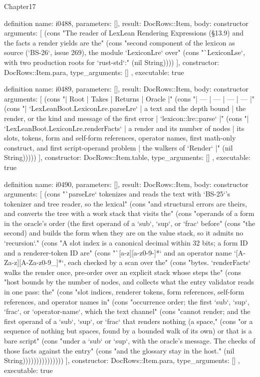 \begin{lexlean}{Chapter17}
\begin{semanticmodule}
definition{
  name: i0488,
  parameters: [],
  result: DocRows::Item,
  body: constructor{
    arguments: [
      (cons "The reader of LexLean Rendering Expressions (§13.9) and the facts a render yields are the" (cons "second component of the lexicon as source (`BS-26`, issue 269), the module `LexiconLre` over" (cons "`LexiconLse`, with two production roots for `rust-std`:" (nil String))))
    ],
    constructor: DocRows::Item.para,
    type_arguments: []
  },
  executable: true
}

definition{
  name: i0489,
  parameters: [],
  result: DocRows::Item,
  body: constructor{
    arguments: [
      (cons "| Root | Takes | Returns | Oracle |" (cons "| --- | --- | --- | --- |" (cons "| `LexLeanBoot.LexiconLre.parseLre` | a text and the depth bound | the render, or the kind and message of the first error | `lexicon::lre::parse` |" (cons "| `LexLeanBoot.LexiconLre.renderFacts` | a render and its number of nodes | its slots, tokens, form and self-form references, operator names, first math-only construct, and first script-operand problem | the walkers of `Render` |" (nil String)))))
    ],
    constructor: DocRows::Item.table,
    type_arguments: []
  },
  executable: true
}

definition{
  name: i0490,
  parameters: [],
  result: DocRows::Item,
  body: constructor{
    arguments: [
      (cons "`parseLre` tokenizes and reads the text with `BS-25`'s tokenizer and tree reader, so the lexical" (cons "and structural errors are theirs, and converts the tree with a work stack that visits the" (cons "operands of a form in the oracle's order (the first operand of a `sub`, `sup`, or `frac` before" (cons "the second) and builds the form when they are on the value stack, so it admits no `recursion`." (cons "A slot index is a canonical decimal within 32 bits; a form ID and a renderer-token ID are" (cons "`[a-z][a-z0-9-]*` and an operator name `[A-Za-z][A-Za-z0-9_]*`, each checked by a scan over the" (cons "bytes. `renderFacts` walks the render once, pre-order over an explicit stack whose steps the" (cons "host bounds by the number of nodes, and collects what the entry validator reads in one pass: the" (cons "slot indices, renderer tokens, form references, self-form references, and operator names in" (cons "occurrence order; the first `sub`, `sup`, `frac`, or `operator-name`, which the text channel" (cons "cannot render; and the first operand of a `sub`, `sup`, or `frac` that renders nothing (a space," (cons "or a sequence of nothing but spaces, found by a bounded walk of its own) or that is a bare script" (cons "under a `sub` or `sup`, with the oracle's message. The checks of those facts against the entry" (cons "and the glossary stay in the host." (nil String)))))))))))))))
    ],
    constructor: DocRows::Item.para,
    type_arguments: []
  },
  executable: true
}


\end{semanticmodule}
\end{lexlean}
